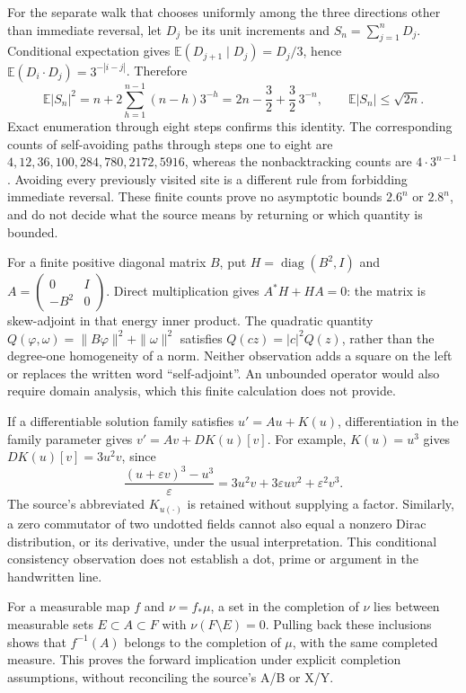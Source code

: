 \documentclass[11pt]{article}
\begin{document}
For the separate walk that chooses uniformly among the three directions other than immediate reversal, let $D_j$ be its unit increments and $S_n=\sum_{j=1}^nD_j$. Conditional expectation gives $\mathbb E(D_{j+1}\mid D_j)=D_j/3$, hence $\mathbb E(D_i\cdot D_j)=3^{-|i-j|}$. Therefore
\[
\mathbb E|S_n|^2=n+2\sum_{h=1}^{n-1}(n-h)3^{-h}
=2n-\frac32+\frac32\,3^{-n},\qquad
\mathbb E|S_n|\leq\sqrt{2n}.
\]
Exact enumeration through eight steps confirms this identity. The corresponding counts of self-avoiding paths through steps one to eight are $4,12,36,100,284,780,2172,5916$, whereas the nonbacktracking counts are $4\cdot3^{n-1}$. Avoiding every previously visited site is a different rule from forbidding immediate reversal. These finite counts prove no asymptotic bounds $2.6^n$ or $2.8^n$, and do not decide what the source means by returning or which quantity is bounded.

For a finite positive diagonal matrix $B$, put $H=\operatorname{diag}(B^2,I)$ and $A=\left(\begin{smallmatrix}0&I\\-B^2&0\end{smallmatrix}\right)$. Direct multiplication gives $A^*H+HA=0$: the matrix is skew-adjoint in that energy inner product. The quadratic quantity $Q(\varphi,\omega)=\|B\varphi\|^2+\|\omega\|^2$ satisfies $Q(cz)=|c|^2Q(z)$, rather than the degree-one homogeneity of a norm. Neither observation adds a square on the left or replaces the written word “self-adjoint”. An unbounded operator would also require domain analysis, which this finite calculation does not provide.

If a differentiable solution family satisfies $u'=Au+K(u)$, differentiation in the family parameter gives $v'=Av+DK(u)[v]$. For example, $K(u)=u^3$ gives $DK(u)[v]=3u^2v$, since
\[
\frac{(u+\varepsilon v)^3-u^3}{\varepsilon}
=3u^2v+3\varepsilon uv^2+\varepsilon^2v^3.
\]
The source's abbreviated $K_{u(\cdot)}$ is retained without supplying a factor. Similarly, a zero commutator of two undotted fields cannot also equal a nonzero Dirac distribution, or its derivative, under the usual interpretation. This conditional consistency observation does not establish a dot, prime or argument in the handwritten line.

For a measurable map $f$ and $\nu=f_*\mu$, a set in the completion of $\nu$ lies between measurable sets $E\subset A\subset F$ with $\nu(F\setminus E)=0$. Pulling back these inclusions shows that $f^{-1}(A)$ belongs to the completion of $\mu$, with the same completed measure. This proves the forward implication under explicit completion assumptions, without reconciling the source's A/B or X/Y.
\end{document}
